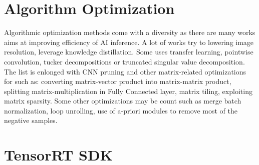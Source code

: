     \section{Algorithm Optimization}
        Algorithmic optimization methods come with a diversity as there are many works aims at improving efficiency of AI inference. A lot of works try to lowering image resolution, leverage knowledge distillation. 
        Some uses transfer learning, pointwise convolution, tucker decompositions or truncated singular value decomposition. The list is enlonged with CNN pruning and other matrix-related optimizations for such as: 
        converting matrix-vector product into matrix-matrix product, splitting matrix-multiplication in Fully Connected layer, matrix tiling, exploiting matrix sparsity. Some other optimizations may be count such 
        as merge batch normalization, loop unrolling, use of a-priori modules to remove most of the negative samples.

\section{TensorRT SDK}

